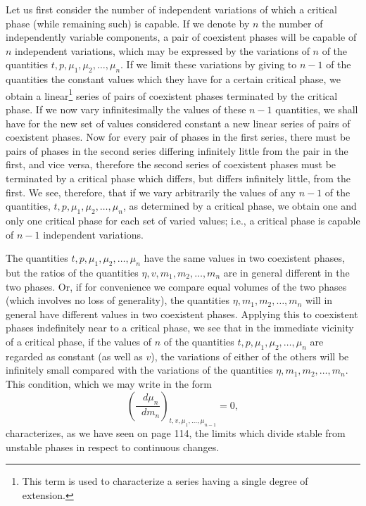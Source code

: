 \documentclass[11pt]{article}
\newcommand{\dd}{\mathop{}\!d}
\newcommand{\symfootnote}[2]{\begingroup\renewcommand{\thefootnote}{#1}\footnote{#2}\endgroup}
\begin{document}
Let us first consider the number of independent variations of which a critical phase (while remaining such) is capable. If we denote by $n$ the number of independently variable components, a pair of coexistent phases will be capable of $n$ independent variations, which may be expressed by the variations of $n$ of the quantities $t,p,\mu_1,\mu_2,\ldots,\mu_n$. If we limit these variations by giving to $n-1$ of the quantities the constant values which they have for a certain critical phase, we obtain a linear\symfootnote{*}{This term is used to characterize a series having a single degree of extension.} series of pairs of coexistent phases terminated by the critical phase. If we now vary infinitesimally the values of these $n-1$ quantities, we shall have for the new set of values considered constant a new linear series of pairs of coexistent phases. Now for every pair of phases in the first series, there must be pairs of phases in the second series differing infinitely little from the pair in the first, and vice versa, therefore the second series of coexistent phases must be terminated by a critical phase which differs, but differs infinitely little, from the first. We see, therefore, that if we vary arbitrarily the values of any $n-1$ of the quantities, $t,p,\mu_1,\mu_2,\ldots,\mu_n$, as determined by a critical phase, we obtain one and only one critical phase for each set of varied values; i.e., a critical phase is capable of $n-1$ independent variations.

The quantities $t,p,\mu_1,\mu_2,\ldots,\mu_n$ have the same values in two coexistent phases, but the ratios of the quantities $\eta,v,m_1,m_2,\ldots,m_n$ are in general different in the two phases. Or, if for convenience we compare equal volumes of the two phases (which involves no loss of generality), the quantities $\eta,m_1,m_2,\ldots,m_n$ will in general have different values in two coexistent phases. Applying this to coexistent phases indefinitely near to a critical phase, we see that in the immediate vicinity of a critical phase, if the values of $n$ of the quantities $t,p,\mu_1,\mu_2,\ldots,\mu_n$ are regarded as constant (as well as $v$), the variations of either of the others will be infinitely small compared with the variations of the quantities $\eta,m_1,m_2,\ldots,m_n$. This condition, which we may write in the form
\begin{equation}\label{eq:gibbs-v1-p3-200}
\left(\frac{\dd\mu_n}{\dd m_n}\right)_{t,v,\mu_1,\ldots,\mu_{n-1}}=0,
\tag{200}
\end{equation}
characterizes, as we have seen on page 114, the limits which divide stable from unstable phases in respect to continuous changes.
\end{document}
